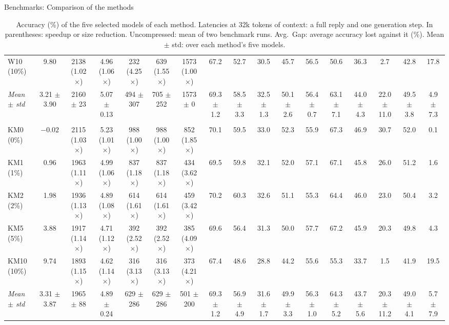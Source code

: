 \documentclass[aspectratio=169,10pt]{beamer}
\begin{document}
\begin{frame}{Benchmarks: Comparison of the methods}{}
\begin{table}
\begin{adjustbox}{width=\linewidth, totalheight=0.64\textheight, keepaspectratio, center}
{\begin{tabular}{lcccccccccccccccc}
W10 (10\%) & 9.80 & 2138 (1.02$\times$) & 4.96 (1.06$\times$) & 232 (4.25$\times$) & 639 (1.55$\times$) & 1573 (1.00$\times$) & 67.2 & 52.7 & 30.5 & 45.7 & 56.5 & 50.6 & 36.3 & 2.7 & 42.8 & 17.8 \\
\emph{Mean $\pm$ std} & 3.21 $\pm$ 3.90 & 2160 $\pm$ 23 & 5.07 $\pm$ 0.13 & 494 $\pm$ 307 & 705 $\pm$ 252 & 1573 $\pm$ 0 & 69.3 $\pm$ 1.2 & 58.5 $\pm$ 3.3 & 32.5 $\pm$ 1.3 & 50.1 $\pm$ 2.6 & 56.4 $\pm$ 0.7 & 63.1 $\pm$ 7.1 & 44.0 $\pm$ 4.3 & 22.0 $\pm$ 11.0 & 49.5 $\pm$ 3.8 & 4.9 $\pm$ 7.3 \\
\addlinespace
\multicolumn{17}{l}{\emph{Hardware-aware + KV cache: least memory}} \\
KM0 (0\%) & $-0.02$ & 2115 (1.03$\times$) & 5.23 (1.01$\times$) & 988 (1.00$\times$) & 988 (1.00$\times$) & 852 (1.85$\times$) & 70.1 & 59.5 & 33.0 & 52.3 & 55.9 & 67.3 & 46.9 & 30.7 & 52.0 & 0.1 \\
KM1 (1\%) & 0.96 & 1963 (1.11$\times$) & 4.99 (1.06$\times$) & 837 (1.18$\times$) & 837 (1.18$\times$) & 434 (3.62$\times$) & 69.5 & 59.8 & 32.1 & 52.0 & 57.1 & 67.1 & 45.8 & 26.0 & 51.2 & 1.6 \\
KM2 (2\%) & 1.98 & 1936 (1.13$\times$) & 4.89 (1.08$\times$) & 614 (1.61$\times$) & 614 (1.61$\times$) & 459 (3.42$\times$) & 70.2 & 60.3 & 32.6 & 51.1 & 55.3 & 64.4 & 46.0 & 23.0 & 50.4 & 3.2 \\
KM5 (5\%) & 3.88 & 1917 (1.14$\times$) & 4.71 (1.12$\times$) & 392 (2.52$\times$) & 392 (2.52$\times$) & 385 (4.09$\times$) & 69.6 & 56.4 & 31.3 & 50.0 & 57.7 & 67.2 & 45.9 & 20.3 & 49.8 & 4.3 \\
KM10 (10\%) & 9.74 & 1893 (1.15$\times$) & 4.62 (1.14$\times$) & 316 (3.13$\times$) & 316 (3.13$\times$) & 373 (4.21$\times$) & 67.4 & 48.6 & 28.8 & 44.2 & 55.6 & 55.3 & 33.7 & 1.5 & 41.9 & 19.5 \\
\emph{Mean $\pm$ std} & 3.31 $\pm$ 3.87 & 1965 $\pm$ 88 & 4.89 $\pm$ 0.24 & 629 $\pm$ 286 & 629 $\pm$ 286 & 501 $\pm$ 200 & 69.3 $\pm$ 1.2 & 56.9 $\pm$ 4.9 & 31.6 $\pm$ 1.7 & 49.9 $\pm$ 3.3 & 56.3 $\pm$ 1.0 & 64.3 $\pm$ 5.2 & 43.7 $\pm$ 5.6 & 20.3 $\pm$ 11.2 & 49.0 $\pm$ 4.1 & 5.7 $\pm$ 7.9 \\
\bottomrule
\end{tabular}}
\end{adjustbox}
\caption{Accuracy (\%) of the five selected models of each method. Latencies at 32k tokens of context: a full reply and one generation step. In parentheses: speedup or size reduction. Uncompressed: mean of two benchmark runs. Avg.\ Gap: average accuracy lost against it (\%). Mean $\pm$ std: over each method's five models.}\label{tab:compare}
\end{table}
\end{frame}
\end{document}
